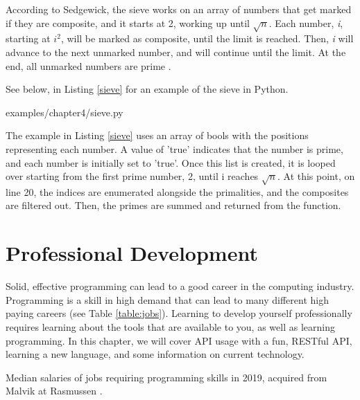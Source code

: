\documentclass[12pt, oneside, a4paper]{book}
\begin{document}
         According to Sedgewick, the sieve works on an array of numbers that get marked if they are composite, and it starts at 2, working up until $\sqrt{n}$.
         Each number, \textit{i}, starting at \textit{$i^2$}, will be marked as composite, until the limit is reached.
         Then, \textit{i} will advance to the next unmarked number, and will continue until the limit.
         At the end, all unmarked numbers are prime \autocite{sedgewickAlgorithms1992}.

         See below, in Listing \ref{sieve} for an example of the sieve in Python.
         
         {examples/chapter4/sieve.py}

         The example in Listing \ref{sieve} uses an array of bools with the positions representing each number.
         A value of 'true' indicates that the number is prime, and each number is initially set to 'true'.
         Once this list is created, it is looped over starting from the first prime number, 2, until i reaches $\sqrt{n}$.
         At this point, on line 20, the indices are enumerated alongside the primalities, and the composites are filtered out.
         Then, the primes are summed and returned from the function.
   \chapter{Professional Development}
   \label{chap:prof_devel}
      Solid, effective programming can lead to a good career in the computing industry.
      Programming is a skill in high demand that can lead to many different high paying careers (see Table \ref*{table:jobs}).
      Learning to develop yourself professionally requires learning about the tools that are available to you, as well as learning programming.
      In this chapter, we will cover API usage with a fun, RESTful API, learning a new language, and some information on current technology.
      \begin{table}[H]
         \caption{
            Median salaries of jobs requiring programming skills in 2019, acquired from Malvik at Rasmussen \autocite{malvikProgrammingCareersCoding}.
         }
         \label{table:jobs}
      \end{table}
\end{document}
